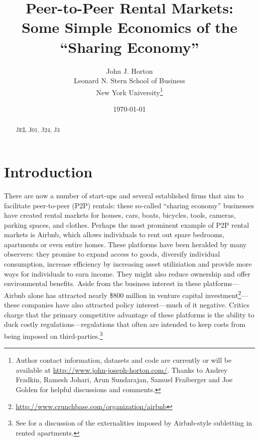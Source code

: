 \documentclass[11pt]{article}
\begin{document}
 

\title{Peer-to-Peer Rental Markets: \\ Some Simple Economics of the ``Sharing Economy''} 

\date{\today}

\author{John J. Horton \\ Leonard N. Stern School of Business \\ New York University\footnote{Author contact information, datasets and code are currently or will be available at \href{http://www.john-joseph-horton.com/}{http://www.john-joseph-horton.com/}. Thanks to Andrey Fradkin, Ramesh Johari, Arun Sundarajan, Samuel Fraiberger and Joe Golden for helpful discussions and comments.} }
\maketitle

\begin{abstract}
\noindent  
\newline 
\noindent JEL J01, J24, J3
\end{abstract} 

\section{Introduction}

There are now a number of start-ups and several established firms that aim to facilitate peer-to-peer (P2P) rentals: 
these so-called ``sharing economy'' businesses have created rental markets for houses, cars, boats, bicycles, tools, cameras, parking spaces, and clothes. 
Perhaps the most prominent example of P2P rental markets is Airbnb, which allows individuals to rent out spare bedrooms, apartments or even entire homes. 
These platforms have been heralded by many observers: 
they promise to expand access to goods, diversify individual consumption, increase efficiency by increasing asset utiliziation and provide more ways for individuals to earn income.
They might also reduce ownership and offer environmental benefits.  
Aside from the business interest in these platforms---Airbnb alone has attracted nearly \$800 million in venture capital investment\footnote{\href{http://www.crunchbase.com/organization/airbnb}{http://www.crunchbase.com/organization/airbnb}}---these companies have also attracted policy interest---much of it negative. 
Critics charge that the primary competitive advantage of these platforms is the ability to duck costly regulations---regulations that often are intended to keep costs from being imposed on third-parties.\footnote{See \cite{horton2014tragedy} for a discussion of the externalities imposed by Airbnb-style subletting in rented apartments.}   
\end{document}
